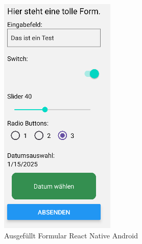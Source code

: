 \begin{figure}[H]
\begin{minipage}{0.45\textwidth}
        \includegraphics[width=\linewidth]{images/form/android/react_native/formCompleted.png}
        \caption{Ausgefüllt Formular React Native Android}
    \end{minipage}
\end{figure}

